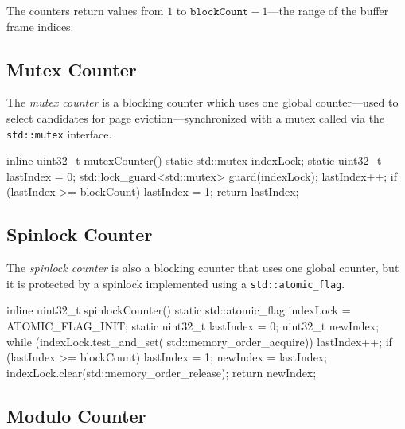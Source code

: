     The counters return values from $1$ to $\texttt{blockCount} - 1$---the range of the buffer frame indices.

\subsection[Mutex Counter]{Mutex Counter} \label{subsec:mutex_counter}

    The \emph{mutex counter} is a blocking counter which uses one global counter---used to select candidates for page eviction---synchronized with a mutex called via the \lstinline{std::mutex} interface.

\begin{@empty}
    \lstset{
        language = [ISO]C++
    }
\begin{centeredshadowboxlisting}
inline uint32_t mutexCounter() {
    static std::mutex indexLock;
    static uint32_t lastIndex = 0;
    std::lock_guard<std::mutex> guard(indexLock);
    lastIndex++;
    if (lastIndex >= blockCount) {
        lastIndex = 1;
    }
    return lastIndex;
}
\end{centeredshadowboxlisting}
\end{@empty}

\subsection[Spinlock Counter]{Spinlock Counter} \label{subsec:spinlock_counter}

    The \emph{spinlock counter} is also a blocking counter that uses one global counter, but it is protected by a spinlock implemented using a \lstinline{std::atomic_flag}.

\begin{@empty}
    \lstset{
        language = [ISO]C++
    }
\begin{centeredshadowboxlisting}
inline uint32_t spinlockCounter() {
    static std::atomic_flag indexLock =
        ATOMIC_FLAG_INIT;
    static uint32_t lastIndex = 0;
    uint32_t newIndex;
    while (indexLock.test_and_set(
               std::memory_order_acquire)) {}
    lastIndex++;
    if (lastIndex >= blockCount) {
        lastIndex = 1;
    }
    newIndex = lastIndex;
    indexLock.clear(std::memory_order_release);
    return newIndex;
}
\end{centeredshadowboxlisting}
\end{@empty}

\subsection[Modulo Counter]{Modulo Counter} \label{subsec:modulo_counter}

